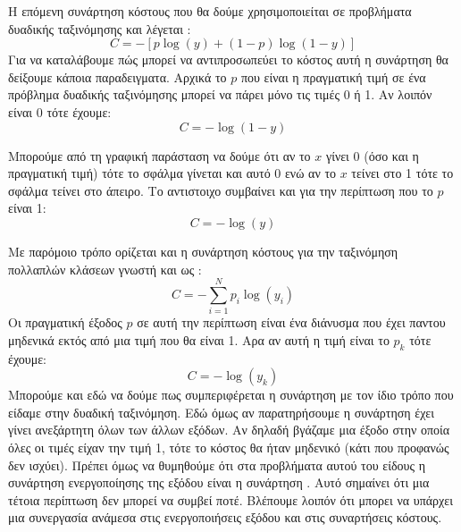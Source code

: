 Η επόμενη συνάρτηση κόστους που θα δούμε χρησιμοποιείται σε προβλήματα δυαδικής ταξινόμησης και λέγεται :
$$C=-[p\log (y) + (1-p)\log (1-y)]$$
Για να καταλάβουμε πώς μπορεί να αντιπροσωπεύει το κόστος αυτή  η συνάρτηση θα δείξουμε κάποια παραδειγματα. Αρχικά το $p$ που είναι η πραγματική τιμή σε ένα πρόβλημα δυαδικής ταξινόμησης μπορεί να πάρει μόνο τις τιμές 0 ή 1. Αν λοιπόν
είναι 0 τότε έχουμε:
$$C=-\log (1-y)$$
\begin{figure}[H]
    \centering
    \caption{}
\end{figure}
Μπορούμε από τη γραφική παράσταση να δούμε ότι αν το $x$ γίνει 0 (όσο και η πραγματική τιμή) τότε το σφάλμα γίνεται και αυτό 0 ενώ αν το $x$ τείνει στο 1 τότε το σφάλμα τείνει στο άπειρο.
Το αντιστοιχο συμβαίνει και για την περίπτωση που το $p$ είναι 1:
$$C=-\log (y)$$
\begin{figure}[H]
    \centering
    \caption{}
\end{figure}
Με παρόμοιο τρόπο ορίζεται και η συνάρτηση κόστους για την ταξινόμηση πολλαπλών κλάσεων γνωστή και ως :
$$C=-\sum\limits_{i=1}^Np_i\log (y_i)$$
Οι πραγματική έξοδος $p$ σε αυτή την περίπτωση είναι ένα διάνυσμα που έχει παντου μηδενικά εκτός από μια τιμή που θα είναι 1. Αρα αν αυτή  η τιμή είναι το $p_k$ τότε έχουμε:
$$C=-\log (y_k)$$
Μπορούμε και εδώ να δούμε πως συμπεριφέρεται η συνάρτηση με τον ίδιο τρόπο που είδαμε στην δυαδική ταξινόμηση. Εδώ όμως αν παρατηρήσουμε η συνάρτηση έχει γίνει ανεξάρτητη όλων των άλλων εξόδων. Αν δηλαδή βγάζαμε μια έξοδο στην οποία όλες οι
τιμές είχαν την τιμή 1, τότε το κόστος θα ήταν μηδενικό (κάτι που προφανώς δεν ισχύει). Πρέπει όμως να θυμηθούμε ότι στα προβλήματα αυτού του είδους η συνάρτηση ενεργοποίησης της εξόδου είναι η συνάρτηση . Αυτό σημαίνει ότι μια
τέτοια περίπτωση δεν μπορεί να συμβεί ποτέ. Βλέπουμε λοιπόν ότι μπορει να υπάρχει μια συνεργασία ανάμεσα στις ενεργοποιήσεις εξόδου και στις συναρτήσεις κόστους.

